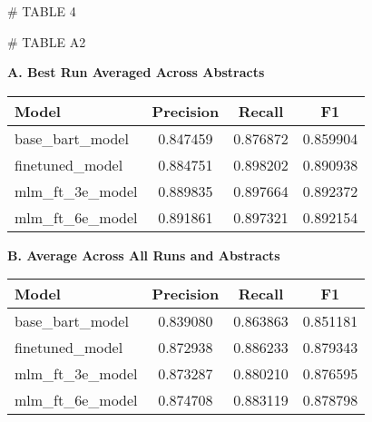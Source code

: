 # TABLE 4

# TABLE A2

\begin{table}[htbp]
    \centering
    \textbf{A. Best Run Averaged Across Abstracts}
    \label{tab:model-metrics-2}
    \begin{tabular}{@{}lccc@{}}
      \toprule
      Model & Precision & Recall & F1 \\
      \midrule
      base\_bart\_model & 0.847459 & 0.876872 & 0.859904 \\
      finetuned\_model & 0.884751 & 0.898202 & 0.890938 \\
      mlm\_ft\_3e\_model & 0.889835 & 0.897664 & 0.892372 \\
      mlm\_ft\_6e\_model & 0.891861 & 0.897321 & 0.892154 \\
      \bottomrule
    \end{tabular}
  \end{table}
  
  \begin{table}[htbp]
    \centering
    \textbf{B. Average Across All Runs and Abstracts}
    \label{tab:model-metrics-1}
    \begin{tabular}{@{}lccc@{}}
      \toprule
      Model & Precision & Recall & F1 \\
      \midrule
      base\_bart\_model & 0.839080 & 0.863863 & 0.851181 \\
      finetuned\_model & 0.872938 & 0.886233 & 0.879343 \\
      mlm\_ft\_3e\_model & 0.873287 & 0.880210 & 0.876595 \\
      mlm\_ft\_6e\_model & 0.874708 & 0.883119 & 0.878798 \\
      \bottomrule
    \end{tabular}
  \end{table}